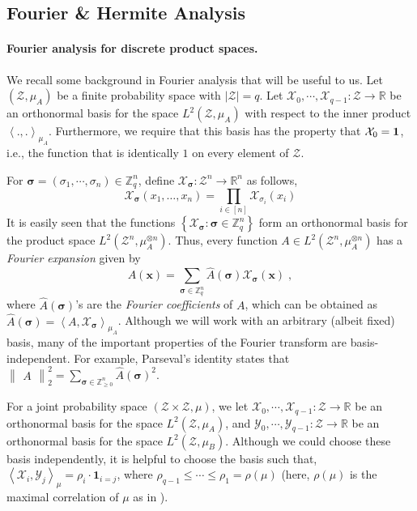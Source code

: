 \documentclass[11pt]{article}
\newcommand{\Red}[1]{\textcolor{red}{#1}}
\newcommand{\inbrace}[1]{\left \{ #1 \right \}}
\newcommand{\inangle}[1]{\left \langle #1 \right \rangle}
\newcommand{\norm}[2]{\begin{Vmatrix} #2 \end{Vmatrix}_{#1}}
\newcommand{\set}[1]{\inbrace{#1}}
\newcommand{\setdef}[2]{\set{#1 : #2}}
\newcommand{\what}[1]{\widehat{#1}}
\newcommand{\bbR}{{\mathbb R}}
\newcommand{\bbZ}{{\mathbb Z}}
\newcommand{\bx}{{\bm x}}
\newcommand{\bsigma}{{\boldsymbol \sigma}}
\newcommand{\calX}{\mathcal{X}}
\newcommand{\calY}{\mathcal{Y}}
\newcommand{\calZ}{\mathcal{Z}}
\begin{document}

\subsection{Fourier \& Hermite Analysis} \label{subsec:analysis_prelim}

\paragraph{Fourier analysis for discrete product spaces.} We recall some background in Fourier analysis that will be useful to us. Let $(\calZ,\mu_A)$ be a finite probability space with $|\calZ| = q$. Let $\calX_0, \cdots, \calX_{q-1}: \calZ \to \bbR$ be an orthonormal basis for the space $L^2(\calZ,\mu_A)$ with respect to the inner product $\inangle{.,.}_{\mu_A}$. Furthermore, we require that this basis has the property that $\calX_0 = {\bf 1}$, i.e., the function that is identically $1$ on every element of $\calZ$.

For $\bsigma = (\sigma_1, \cdots, \sigma_n) \in \bbZ_q^n$, define $\calX_{\bsigma} : \calZ^n \to \bbR^n$ as follows,
\[ \calX_{\bsigma}(x_1,\dots,x_n) = \prod_{i \in [n]} \calX_{\sigma_i}(x_i) \]
It is easily seen that the functions $\setdef{\calX_{\bsigma}}{\bsigma \in \bbZ_q^n}$ form an orthonormal basis for the product space $L^2(\calZ^n, \mu_A^{\otimes n})$. Thus, every function $A \in L^2(\calZ^n, \mu_A^{\otimes n})$ has a {\em Fourier expansion} given by
$$A(\bx) = \sum\limits_{\bsigma \in \bbZ_q^n} \what{A}(\bsigma) \calX_{\bsigma}(\bx)\;,$$
where $\what{A}(\bsigma)$'s are the {\em Fourier coefficients} of $A$, which can be obtained as $\what{A}(\bsigma) = \inangle{A,\calX_{\bsigma}}_{\mu_A}$. Although we will work with an arbitrary (albeit fixed) basis, many of the important properties of the Fourier transform are basis-independent. For example, Parseval's identity states that $\norm{2}{A}^2 = \sum_{\bsigma \in \bbZ_{\ge 0}^n} \what{A}(\bsigma)^2$.

For a joint probability space $(\calZ \times \calZ, \mu)$, we let $\calX_0, \cdots, \calX_{q-1}: \calZ \to \bbR$ be an orthonormal basis for the space $L^2(\calZ,\mu_A)$, and $\calY_0, \cdots, \calY_{q-1}: \calZ \to \bbR$ be an orthonormal basis for the space $L^2(\calZ,\mu_B)$. Although we could choose these basis independently, it is helpful to choose the basis such that, $\inangle{\calX_i, \calY_j}_{\mu} = \rho_i \cdot \mathbf{1}_{i = j}$, where $\rho_{q-1} \le \cdots \le \rho_1 = \rho(\mu)$ (here, $\rho(\mu)$ is the maximal correlation of $\mu$ as in ).
\end{document}
